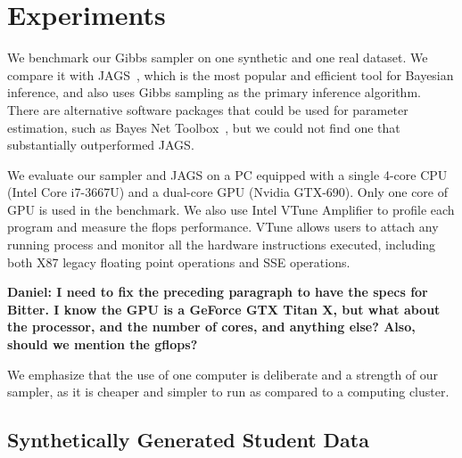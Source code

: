 \documentclass{article} %
\begin{document}
\section{Experiments}\label{sec:experiments}

We benchmark our Gibbs sampler on one synthetic and one real dataset. We compare it with
JAGS~\citep{JAGS2003}, which is the most popular and efficient tool for Bayesian inference, and also
uses Gibbs sampling as the primary inference algorithm. There are alternative software packages that
could be used for parameter estimation, such as Bayes Net Toolbox~\citep{bnt2001}, but we could not
find one that substantially outperformed JAGS.

We evaluate our sampler and JAGS on a PC equipped with a single 4-core CPU (Intel Core i7-3667U)
and a dual-core GPU (Nvidia GTX-690). Only one core of GPU is used in the benchmark. We also use
Intel VTune Amplifier to profile each program and measure the flops performance. VTune allows users
to attach any running process and monitor all the hardware instructions executed, including both X87
legacy floating point operations and SSE operations.

\textbf{Daniel: I need to fix the preceding paragraph to have the specs for Bitter. I know the GPU
is a GeForce GTX Titan X, but what about the processor, and the number of cores, and anything else?
Also, should we mention the gflops?}

We emphasize that the use of one computer is deliberate and a strength of our sampler, as it is
cheaper and simpler to run as compared to a computing cluster.


\subsection{Synthetically Generated Student Data}\label{ssec:student_data}
\end{document}
